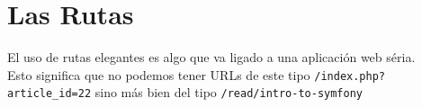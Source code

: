 \section{Las Rutas}

El uso de rutas elegantes es algo que va ligado a una aplicación web séria.
\medskip\\
Esto significa que no podemos tener URLs de este tipo \texttt{/index.php?article\_id=22} sino más bien del tipo \texttt{/read/intro-to-symfony}
